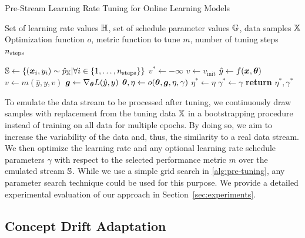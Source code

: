 \documentclass{article} %
\begin{document}
\begin{algorithm}[t]
   \caption{Pre-Stream Learning Rate Tuning for Online Learning Models}\label{alg:pre-tuning}
   \begin{algorithmic}[1]
      \Require Set of learning rate values ${\mathbb{H}}$, set of schedule parameter values ${\mathbb{G}}$, data samples ${\mathbb{X}}$
      \Require Optimization function $o$, metric function to tune $m$, number of tuning steps $n_{\rm{steps}}$

      \State ${\mathbb{S}} \gets \{({\bm{x}}_i, y_i) \sim \hat{p}_{{\mathbb{X}}}| \forall i \in \{1, \ldots, n_{\text{steps}}\} \}$ 
      \State $v^* \gets -\infty$
      \State $v \gets v_{\textrm{init}}$ 
      \State $\hat{y} \gets f({\bm{x}}, {\bm{\theta}})$ 
      \State $v \gets m(\hat{y}, y, v)$ 
      \State ${\bm{g}} \gets \nabla_{{\bm{\theta}}} L(\hat{y}, y)$ 
      \State ${\bm{\theta}}, \eta \gets o({\bm{\theta}}, {\bm{g}}, \eta, \gamma)$ 
      \EndFor
      \State $\eta^* \gets \eta$ 
      \State $\gamma^* \gets \gamma$ 
      \EndIf
      \EndFor
      \State \textbf{return} $\eta^*, \gamma^*$ 
   \end{algorithmic}
\end{algorithm}

To emulate the data stream to be processed after tuning, we continuously draw samples with replacement from the tuning data ${\mathbb{X}}$ in a bootstrapping procedure instead of training on all data for multiple epochs.
By doing so, we aim to increase the variability of the data and, thus, the similarity to a real data stream.
We then optimize the learning rate and any optional learning rate schedule parameters $\gamma$ with respect to the selected performance metric $m$ over the emulated stream ${\mathbb{S}}$.
While we use a simple grid search in \cref{alg:pre-tuning}, any parameter search technique could be used for this purpose.
We provide a detailed experimental evaluation of our approach in Section~\ref{sec:experiments}.

\subsection{Concept Drift Adaptation}
\end{document}

